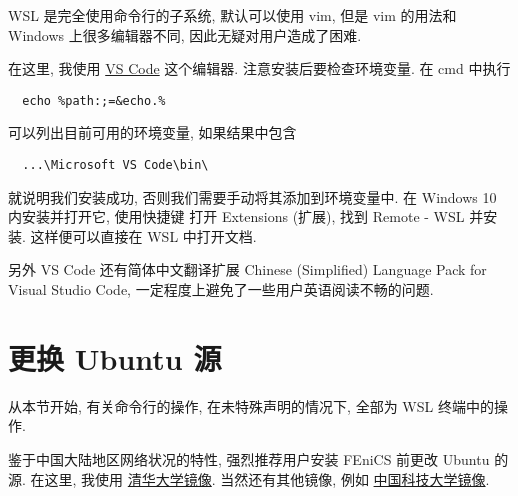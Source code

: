 \documentclass[fontset=founder]{ctexrep}
\begin{document}
WSL 是完全使用命令行的子系统,
默认可以使用 vim,
但是 vim 的用法和 Windows 上很多编辑器不同,
因此无疑对用户造成了困难.

在这里,
我使用
\href{https://code.visualstudio.com/}{VS Code}
这个编辑器.
注意安装后要检查环境变量.
在 \textsf{cmd} 中执行
\begin{lstlisting}
  echo %path:;=&echo.%
\end{lstlisting}
可以列出目前可用的环境变量,
如果结果中包含
\begin{lstlisting}
  ...\Microsoft VS Code\bin\
\end{lstlisting}
就说明我们安装成功,
否则我们需要手动将其添加到环境变量中.
在 Windows 10 内安装并打开它,
使用快捷键  打开 \textsf{Extensions (扩展)},
找到 \textsf{Remote - WSL} 并安装.
这样便可以直接在 WSL 中打开文档.

另外 VS Code 还有简体中文翻译扩展 \textsf{Chinese (Simplified) Language Pack for Visual Studio Code},
一定程度上避免了一些用户英语阅读不畅的问题.

\section{更换 Ubuntu 源}

从本节开始,
有关命令行的操作,
在未特殊声明的情况下,
全部为 WSL 终端中的操作.

鉴于中国大陆地区网络状况的特性,
强烈推荐用户安装 FEniCS 前更改 Ubuntu 的源.
在这里,
我使用%
\href{https://mirrors.tuna.tsinghua.edu.cn/help/ubuntu/}{清华大学镜像}.
当然还有其他镜像,
例如%
\href{https://mirrors.ustc.edu.cn/help/ubuntu.html}{中国科技大学镜像}.
\end{document}
